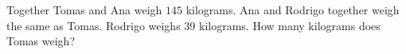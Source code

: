 Together Tomas and Ana weigh $145$ kilograms. Ana and Rodrigo together weigh the same as Tomas. Rodrigo weighs $39$ kilograms. How many kilograms does Tomas weigh?
